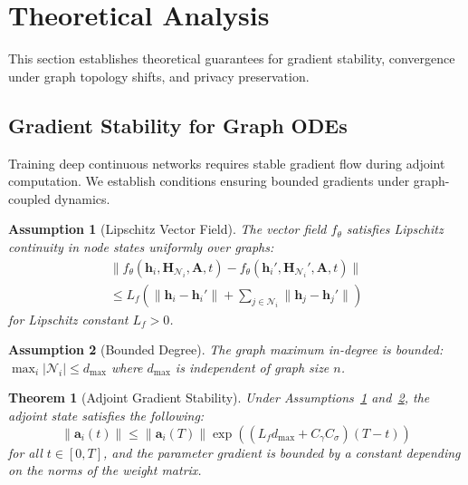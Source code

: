 \documentclass[lettersize,journal]{IEEEtran}
\newtheorem{theorem}{Theorem}
\newtheorem{assumption}{Assumption}
\begin{document}
\section{Theoretical Analysis}
\label{sec:theory}

This section establishes theoretical guarantees for gradient stability, convergence under graph topology shifts, and privacy preservation.

\subsection{Gradient Stability for Graph ODEs}

Training deep continuous networks requires stable gradient flow during adjoint computation. We establish conditions ensuring bounded gradients under graph-coupled dynamics.

\begin{assumption}[Lipschitz Vector Field]
\label{ass:lipschitz}
The vector field $f_\theta$ satisfies Lipschitz continuity in node states uniformly over graphs:
\begin{equation}
\begin{aligned}
\|f_\theta(\mathbf{h}_i, \mathbf{H}_{\mathcal{N}_i}, \mathbf{A}, t) - f_\theta(\mathbf{h}_i', \mathbf{H}_{\mathcal{N}_i}', \mathbf{A}, t)\| \\ \leq L_f (\|\mathbf{h}_i - \mathbf{h}_i'\| +  \sum_{j \in \mathcal{N}_i} \|\mathbf{h}_j - \mathbf{h}_j'\|)
\end{aligned}
\end{equation}
for Lipschitz constant $L_f > 0$.
\end{assumption}

\begin{assumption}[Bounded Degree]
\label{ass:degree}
The graph maximum in-degree is bounded: $\max_{i} |\mathcal{N}_i| \leq d_{\max}$ where $d_{\max}$ is independent of graph size $n$.
\end{assumption}

\begin{theorem}[Adjoint Gradient Stability]
\label{thm:gradient_stability}
Under Assumptions~\ref{ass:lipschitz} and~\ref{ass:degree}, the adjoint state satisfies the following:
\begin{equation}
\|\mathbf{a}_i(t)\| \leq \|\mathbf{a}_i(T)\| \exp((L_f d_{\max} + C_\gamma C_\sigma)(T - t))
\end{equation}
for all $t \in [0,T]$, and the parameter gradient is bounded by a constant depending on the norms of the weight matrix.
\end{theorem}
\end{document}
